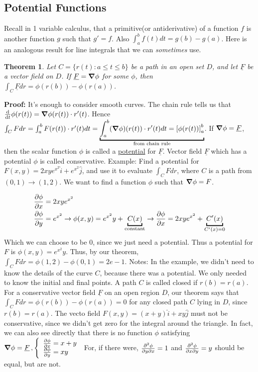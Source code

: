 \documentclass{article}
\newtheorem{theorem}{Theorem}[section]
\newcommand{\n}{\leavevmode \newline} %
\newcommand{\nn}{\leavevmode \newline \newline} %
\numberwithin{equation}{subsection} %
\begin{document}
\subsection{Potential Functions}
Recall in 1 variable calculus, that a primitive(or antiderivative) of a function $f$ is another function $g$ such that $g'=f$. Also $\int_a^b f(t)dt=g(b)-g(a)$. Here is an analogous result for line integrals that we can \textit{sometimes} use.

\begin{theorem}
Let $C=\{r(t):a\leq t \leq b\}$ be a path in an open set $D$, and let $\underline{F}$ be a vector field on $D$. If $\underline{F}=\grad\phi$ for some $\phi$, then $\int_C \underline{F} dr = \phi(r(b)) - \phi(r(a))$.
\end{theorem}
\n
\textbf{Proof:} It's enough to consider smooth curves. The chain rule tells us that $\dv{t} \phi(r(t))=\grad \phi(r(t))\cdot r'(t)$. Hence $\int_C Fdr=\int_a^b F(r(t))\cdot r'(t) dt = \underbracket{\int_a^b (\grad\phi)(r(t)) \cdot r'(t) dt = \left[ \phi(r(t))\right]_a^b}_{\text{from chain rule}}$. If $\grad\phi=\underline{F}$, then the scalar function $\phi$ is called a \underline{potential} for $\underline{F}$. Vector field $\underline{F}$ which has a potential $\phi$ is called conservative.
\nn
Example: Find a potential for $F(x,y)=2xye^{x^2}\hat{i}+e^{x^2}\hat{j}$, and use it to evaluate $\int_C Fdr$, where $C$ is a path from $(0,1)\to(1,2)$. We want to find a function $\phi$ such that $\grad\phi=F$.

\begin{equation}
    \begin{split}
        \pdv{\phi}{x}&=2xye^{x^2} \\
        \pdv{\phi}{y}&=e^{x^2} \to \phi(x,y)=e^{x^2}y+\underbracket{C(x)}_{\text{constant}}\to\pdv{\phi}{x}=2xye^{x^2}+\underbracket{C'(x)}_{C'(x)=0}
    \end{split}
\end{equation}
Which we can choose to be 0, since we just need a potential. Thus a potential for $F$ is $\phi(x,y)=e^{x^2}y$. Thus, by our theorem, $\int_C Fdr=\phi(1,2)-\phi(0,1)=2e-1$.
\nn
Notes: In the example, we didn't need to know the details of the curve $C$, because there was a potential. We only needed to know the initial and final points. A path $C$ is called closed if $r(b)=r(a)$. For a conservative vector field $\underline{F}$ on an open region $D$, our theorem says that $\int_C Fdr=\phi(r(b))-\phi(r(a)) = 0$ for any closed path $C$ lying in $D$, since $r(b)=r(a)$. The vecto field $F(x,y)=(x+y)\hat{i}+xy\hat{j}$ must not be conservative, since we didn't get zero for the integral around the triangle. In fact, we can also see directly that there is no function $\phi$ satisfying $\grad\phi=\underline{F}\,,\left\{\begin{array}{ll}
    \pdv{\phi}{x}=x+y \\ \pdv{\phi}{y}=xy
\end{array}\right.$ For, if there were, $\pdv{\phi}{y}{x}=1$ and $\pdv{\phi}{x}{y}=y$ should be equal, but are not.
\end{document}
